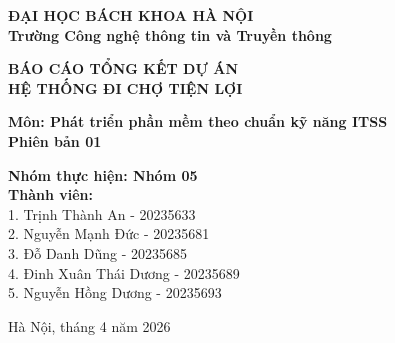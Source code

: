 \begin{titlepage}
\begin{center}
    
    \Large
    \textbf{ĐẠI HỌC BÁCH KHOA HÀ NỘI} \\
    \textbf{Trường Công nghệ thông tin và Truyền thông}
    
    \vspace{2cm}
    
    \huge
    \textbf{BÁO CÁO TỔNG KẾT DỰ ÁN} \\
    \textbf{HỆ THỐNG ĐI CHỢ TIỆN LỢI}
    
    \vspace{1.5cm}

    \large
    \textbf{Môn: Phát triển phần mềm theo chuẩn kỹ năng ITSS} \\
    \textbf{Phiên bản 01}
    
    
    \large
    \begin{center}
        \textbf{Nhóm thực hiện: Nhóm 05} \\
        \textbf{Thành viên:} \\
        1. Trịnh Thành An - 20235633 \\
        2. Nguyễn Mạnh Đức - 20235681 \\
        3. Đỗ Danh Dũng - 20235685 \\
        4. Đinh Xuân Thái Dương - 20235689 \\
        5. Nguyễn Hồng Dương - 20235693
    \end{center}
    
    \vfill
    
    \large
    Hà Nội, tháng 4 năm 2026
    
\end{center}
\end{titlepage}
